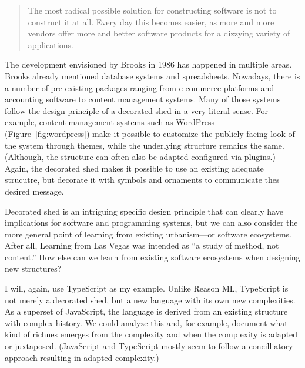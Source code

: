 \begin{quote}
The most radical possible solution for constructing software is not to construct it at all.
Every day this becomes easier, as more and more vendors offer more and better software products
for a dizzying variety of applications.
\end{quote}

The development envisioned by Brooks in 1986 has happened in multiple areas. Brooks already
mentioned database systems and spreadsheets. Nowadays, there is a number of pre-existing packages
ranging from e-commerce platforms and accounting software to content management systems.
Many of those systems follow the design principle of a decorated shed in a very literal sense.
For example, content management systems such as WordPress (Figure~\ref{fig:wordpress}) make it
possible to customize the publicly facing look of the system through themes, while the underlying
structure remains the same. (Although, the structure can often also be adapted configured via
plugins.) Again, the decorated shed makes it possible to use an existing adequate strucutre,
but decorate it with symbols and ornaments to communicate thes desired message.


Decorated shed is an intriguing specific design principle that can clearly have implications
for software and programming systems, but we can also consider the more general point
of learning from existing urbanism---or software ecosystems. After all, Learning from Las Vegas
was intended as ``a study of method, not content.'' How else can we learn
from existing software ecosystems when designing new structures?

I will, again, use TypeScript as my example. Unlike Reason ML, TypeScript is not merely a decorated
shed, but a new language with its own new complexities. As a superset of JavaScript, the language is
derived from an existing structure with complex history. We could analyze this and, for example,
document what kind of richnes emerges from the complexity and when the complexity is adapted or
juxtaposed. (JavaScript and TypeScript mostly seem to follow a concilliatory approach resulting in
adapted complexity.)

